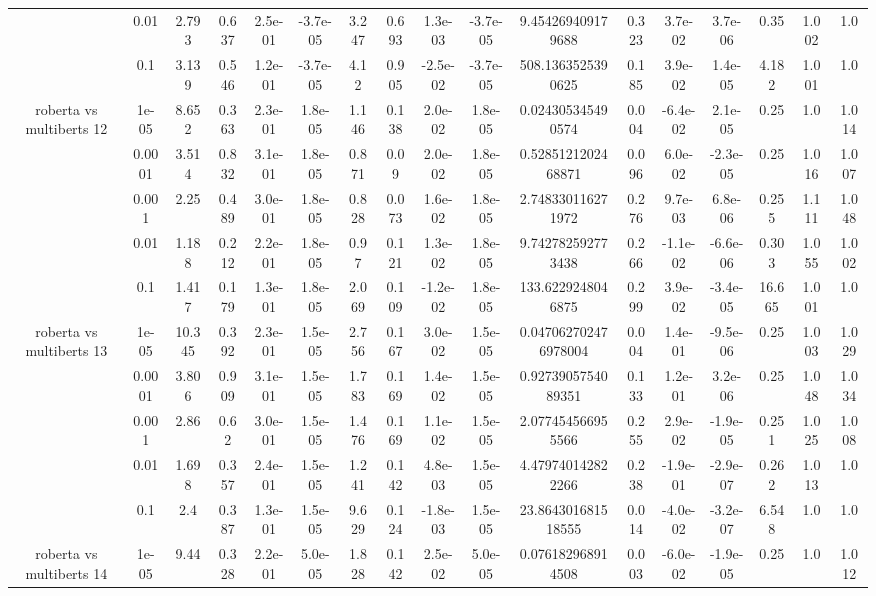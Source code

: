 \begin{tabular}{|c|c|c|c|c|c|c|c|c|c|c|c|c|c|c|c|c|}
 & 0.01 & 2.793 & 0.637 & 2.5e-01 & -3.7e-05 & 3.247 & 0.693 & 1.3e-03 & -3.7e-05 & 9.454269409179688 & 0.323 & 3.7e-02 & 3.7e-06 & 0.35 & 1.002 & 1.0 \\
 & 0.1 & 3.139 & 0.546 & 1.2e-01 & -3.7e-05 & 4.12 & 0.905 & -2.5e-02 & -3.7e-05 & 508.1363525390625 & 0.185 & 3.9e-02 & 1.4e-05 & 4.182 & 1.001 & 1.0 \\
\hline
\multirow{5}{*}{roberta  vs multiberts 12} & 1e-05 & 8.652 & 0.363 & 2.3e-01 & 1.8e-05 & 1.146 & 0.138 & 2.0e-02 & 1.8e-05 & 0.024305345490574 & 0.004 & -6.4e-02 & 2.1e-05 & 0.25 & 1.0 & 1.014 \\
 & 0.0001 & 3.514 & 0.832 & 3.1e-01 & 1.8e-05 & 0.871 & 0.09 & 2.0e-02 & 1.8e-05 & 0.5285121202468871 & 0.096 & 6.0e-02 & -2.3e-05 & 0.25 & 1.016 & 1.007 \\
 & 0.001 & 2.25 & 0.489 & 3.0e-01 & 1.8e-05 & 0.828 & 0.073 & 1.6e-02 & 1.8e-05 & 2.748330116271972 & 0.276 & 9.7e-03 & 6.8e-06 & 0.255 & 1.111 & 1.048 \\
 & 0.01 & 1.188 & 0.212 & 2.2e-01 & 1.8e-05 & 0.97 & 0.121 & 1.3e-02 & 1.8e-05 & 9.742782592773438 & 0.266 & -1.1e-02 & -6.6e-06 & 0.303 & 1.055 & 1.002 \\
 & 0.1 & 1.417 & 0.179 & 1.3e-01 & 1.8e-05 & 2.069 & 0.109 & -1.2e-02 & 1.8e-05 & 133.6229248046875 & 0.299 & 3.9e-02 & -3.4e-05 & 16.665 & 1.001 & 1.0 \\
\hline
\multirow{5}{*}{roberta  vs multiberts 13} & 1e-05 & 10.345 & 0.392 & 2.3e-01 & 1.5e-05 & 2.756 & 0.167 & 3.0e-02 & 1.5e-05 & 0.047062702476978004 & 0.004 & 1.4e-01 & -9.5e-06 & 0.25 & 1.003 & 1.029 \\
 & 0.0001 & 3.806 & 0.909 & 3.1e-01 & 1.5e-05 & 1.783 & 0.169 & 1.4e-02 & 1.5e-05 & 0.9273905754089351 & 0.133 & 1.2e-01 & 3.2e-06 & 0.25 & 1.048 & 1.034 \\
 & 0.001 & 2.86 & 0.62 & 3.0e-01 & 1.5e-05 & 1.476 & 0.169 & 1.1e-02 & 1.5e-05 & 2.077454566955566 & 0.255 & 2.9e-02 & -1.9e-05 & 0.251 & 1.025 & 1.008 \\
 & 0.01 & 1.698 & 0.357 & 2.4e-01 & 1.5e-05 & 1.241 & 0.142 & 4.8e-03 & 1.5e-05 & 4.479740142822266 & 0.238 & -1.9e-01 & -2.9e-07 & 0.262 & 1.013 & 1.0 \\
 & 0.1 & 2.4 & 0.387 & 1.3e-01 & 1.5e-05 & 9.629 & 0.124 & -1.8e-03 & 1.5e-05 & 23.864301681518555 & 0.014 & -4.0e-02 & -3.2e-07 & 6.548 & 1.0 & 1.0 \\
\hline
\multirow{5}{*}{roberta  vs multiberts 14} & 1e-05 & 9.44 & 0.328 & 2.2e-01 & 5.0e-05 & 1.828 & 0.142 & 2.5e-02 & 5.0e-05 & 0.076182968914508 & 0.003 & -6.0e-02 & -1.9e-05 & 0.25 & 1.0 & 1.012 \\

\end{tabular}
